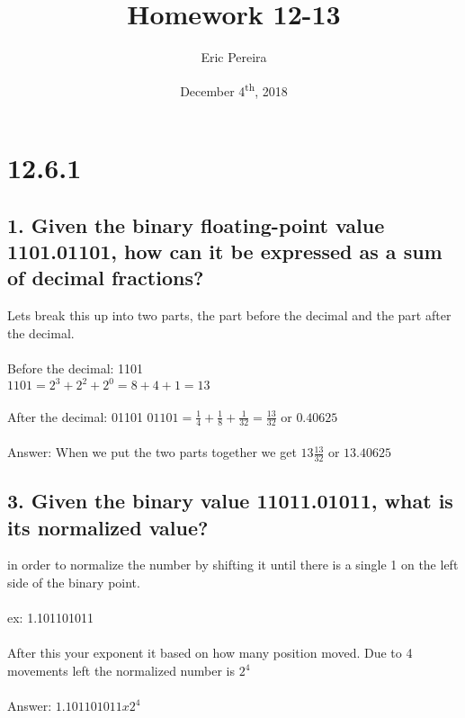 \documentclass[12pt]{article}
\begin{document}
	

\begin{titlepage}
	
\author{Eric Pereira}
\date{December 4\textsuperscript{th}, 2018}
\title{Homework 12-13}

\maketitle

\end{titlepage}

\tableofcontents

\newpage {}

\section*{12.6.1}
%

\subsection*{1. Given the binary floating-point value 1101.01101, how can it be expressed as a sum of decimal fractions?}
%
Lets break this up into two parts, the part before the decimal and the part after the decimal. \\ \\
Before the decimal: 1101 \\ 
$1101 = 2^3 + 2^2 + 2^0 = 8 + 4 + 1 = 13$ \\ \\
After the decimal: 01101
$01101 = \frac{1}{4} + \frac{1}{8} + \frac{1}{32} = \frac{13}{32}$ or $0.40625$ \\ \\
Answer: When we put the two parts together we get $13\frac{13}{32}$ or $13.40625$
\subsection*{3. Given the binary value 11011.01011, what is its normalized value?}
%

in order to normalize the number by shifting it until there is a single 1 on the left side of the binary point. \\ \\
ex: 1.101101011 \\ \\ 
After this your exponent it based on how many position moved. Due to 4 movements left the normalized number is $2^4$ \\ \\
Answer: $1.101101011x2^4$
\end{document}
